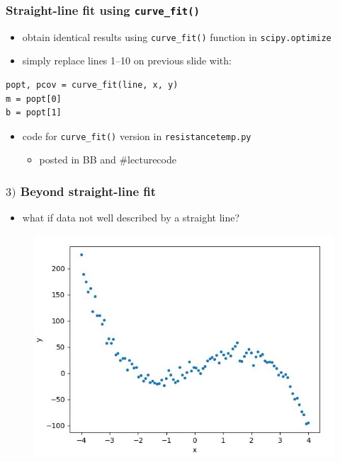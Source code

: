 \documentclass[english,14pt]{beamer}
\begin{document}

\begin{frame}[fragile]

\frametitle{Straight-line fit using \texttt{curve\_fit()}}

\begin{itemize}
	\item obtain identical results using \texttt{curve\_fit()} function in \texttt{scipy.optimize}
	\item simply replace lines 1--10 on previous slide with:
\end{itemize}

\begin{lstlisting}[style=CStyle,basicstyle=\footnotesize]
popt, pcov = curve_fit(line, x, y)
m = popt[0]
b = popt[1]
\end{lstlisting}

\begin{itemize}
	\item code for \texttt{curve\_fit()} version in \texttt{resistancetemp.py}
	\begin{itemize}
		\item posted in BB and \#lecturecode
	\end{itemize}
\end{itemize}

\end{frame}


\begin{frame}[fragile]

\frametitle{$3)$ Beyond straight-line fit}

\begin{itemize}
	\item what if data not well described by a straight line?
\end{itemize}
\vspace*{-3mm}
\begin{figure}[ht]
	\centering
	\includegraphics[width=.7\textwidth]{figures/cubicdatapoints}
\end{figure}

\end{frame}
\end{document}
